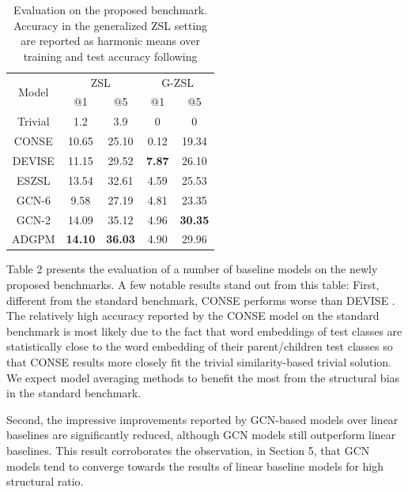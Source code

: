 \begin{table}[h]
\centering
\caption{Evaluation on the proposed benchmark. Accuracy in the generalized ZSL setting are reported as harmonic means over training and test accuracy following \cite{xian2017zero}}
\begin{tabular}{ c c c | c c }
\hline
\multirow{2}{*}{Model} & \multicolumn{2}{c}{ZSL} & \multicolumn{2}{c}{G-ZSL} \\
                                                   & @1  & @5      & @1  & @5 \\
\hline
Trivial                                            & 1.2    & 3.9     & 0      & 0 \\
\hline
CONSE            \cite{norouzi2013zero}            & 10.65  & 25.10   & 0.12   &  19.34 \\

DEVISE           \cite{frome2013devise}            & 11.15  & 29.52   & \textbf{7.87}   & 26.10  \\
ESZSL            \cite{romera2015embarrassingly}   & 13.54  & 32.61   & 4.59   & 25.53 \\

\hline
GCN-6            \cite{wang2018zero}               & 9.58   & 27.19   & 4.81   & 23.35 \\
GCN-2            \cite{kampffmeyer2018rethinking}  & 14.09  & 35.12   & 4.96   & \textbf{30.35} \\
ADGPM            \cite{kampffmeyer2018rethinking}  & \textbf{14.10} & \textbf{36.03}  & 4.90 & 29.96 \\
\hline
\end{tabular}
\end{table}

Table 2 presents the evaluation of a number of baseline models on the newly proposed benchmarks.
A few notable results stand out from this table:
First, different from the standard benchmark, CONSE \cite{norouzi2013zero} performs worse than DEVISE \cite{frome2013devise}.
The relatively high accuracy reported by the CONSE model on the standard benchmark
is most likely due to the fact that word embeddings of test classes are statistically close to
the word embedding of their parent/children test classes so that CONSE 
results more closely fit the trivial similarity-based trivial solution. 
We expect model averaging methods to benefit the most from the structural bias in the standard benchmark.

Second, the impressive improvements reported by GCN-based models over linear baselines are significantly reduced, 
although GCN models still outperform linear baselines. 
This result corroborates the observation, in Section 5, that GCN models 
tend to converge towards the results of linear baseline models for high structural ratio.

